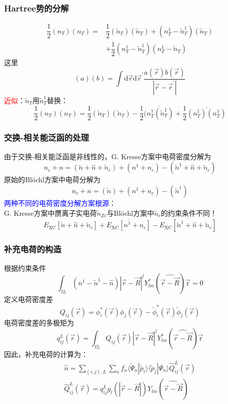 \documentclass[cjk,slidestop,compress,mathserif,blue]{beamer}
\begin{document}
\frame
{
\frametitle{Hartree势的分解}
\begin{displaymath}
	\begin{aligned}
		\dfrac12(n_T)(n_T)=&\dfrac12(\tilde n_T)(\tilde n_T)+(n_T^1-\tilde n_T^1)(\tilde n_T)\\
				&+\dfrac12(n_T^1-\tilde n_T^1)(n_T^1-\tilde n_T)
	\end{aligned}
\end{displaymath}
这里$$(a)(b)=\int\mathrm{d}\vec r\mathrm{d}\vec r^{\prime}\dfrac{a(\vec r)b(\vec r)}{|\vec r-\vec r^{\prime}|}$$
\textcolor{red}{近似}：$\tilde n_T$用$\tilde n_T^1$替换：
\begin{displaymath}
	\dfrac12(n_T)(n_T)=\dfrac12(\tilde n_T)(\tilde n_T)-\dfrac12\overline{(n_T^1(\tilde n_T^1)}+\dfrac12\overline{(n_T^1)(n_T^1)}
\end{displaymath}
}

\frame
{
\frametitle{交换-相关能泛函的处理}
由于交换-相关能泛函是非线性的，\textrm{G. Kresse}方案中电荷密度分解为
\begin{displaymath}
	n_c+n=(\tilde n+\hat n+\tilde n_c)+(n^1+n_c)-(\tilde n^1+\hat n+\tilde n_c)
\end{displaymath}
原始的\textrm{Bl\"ochl}方案中电荷分解为
\begin{displaymath}
	n_c+n=(\tilde n)+(n^1+n_c)-(\tilde n^1)
\end{displaymath}
\textcolor{blue}{两种不同的电荷密度分解方案根源}：\\\textrm{G. Kresse}方案中赝离子实电荷$\tilde n_{Zc}$与\textrm{Bl\"ochl}方案中$\tilde n_c$的约束条件不同！
\begin{displaymath}
	E_{\mathrm{XC}}[\tilde n+\hat n+\tilde n_c]+\overline{E_{\mathrm{XC}}[n^1+n_c]}-\overline{E_{\mathrm{XC}}[\tilde n^1+\hat n+\tilde n_c]}
\end{displaymath}
}

\frame
{
	\frametitle{补充电荷的构造}
	根据约束条件
	\begin{displaymath}
		\int_{\Omega_c}(n^1-\tilde n^1-\hat n)|\vec r-\vec R|^lY_{lm}^{\ast}(\widehat{\vec r-\vec R})\mathrm{\vec r}=0
	\end{displaymath}
	定义电荷密度差
	\begin{displaymath}
		Q_{ij}(\vec r)=\phi_i^{\ast}(\vec r)\phi_j(\vec r)-\tilde\phi_i^{\ast}(\vec r)\tilde\phi_j(\vec r)
	\end{displaymath}
	电荷密度差的多极矩为
	\begin{displaymath}
		q_{ij}^L(\vec r)=\int_{\Omega_c}Q_{ij}(\vec r)|\vec r-\vec R|^lY_{lm}^{\ast}(\widehat{\vec r-\vec R})\mathrm{\vec r}
	\end{displaymath}
	因此，补充电荷的计算为：
	\begin{displaymath}
		\begin{aligned}
			\hat n=\sum_{(i,j),L}\sum_n f_n\langle\tilde\Psi_n|\tilde p_i\rangle\langle\tilde p_j|\Psi_n\rangle\hat Q_{ij}^L(\vec r)\\
			\hat Q_{ij}^L(\vec r)=q_{ij}^Lg_l(|\vec r-\vec R|)Y_{lm}(\widehat{\vec r-\vec R})
		\end{aligned}
	\end{displaymath}
}
\end{document}
